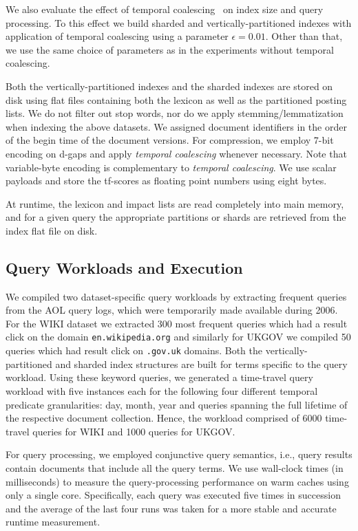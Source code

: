 We also evaluate the effect of temporal coalescing~\cite{kberberi:sigir2007} on index size and query
processing. To this effect we build sharded and vertically-partitioned indexes with application of temporal coalescing using a parameter
$\epsilon=0.01$. Other than that, we use the same choice of parameters
as in the experiments without temporal coalescing.


Both the vertically-partitioned indexes and the sharded indexes are stored on disk using flat files containing both the lexicon as well as the partitioned posting lists. We do not filter out stop words, nor do we apply stemming/lemmatization when indexing the above datasets. We assigned document identifiers in the order of the begin time of the document versions. For compression, we employ 7-bit encoding on d-gaps and apply \emph{temporal coalescing} whenever necessary. Note that variable-byte encoding is complementary to \emph{temporal coalescing}. We use scalar payloads and store the tf-scores as floating point numbers using eight bytes. 

At runtime, the lexicon and impact lists are read
completely into main memory, and for a given query the appropriate
partitions or shards are retrieved from the index flat file on disk.

\subsection{Query Workloads and Execution}
\label{sec:sharding_workloads}
We compiled two dataset-specific query workloads by extracting
frequent queries from the AOL query logs, which were temporarily made
available during 2006. For the WIKI dataset we extracted 300 most
frequent queries which had a result click on the domain
\texttt{en.wikipedia.org} and similarly for UKGOV we compiled 50
queries which had result click on \texttt{.gov.uk} domains. Both the
vertically-partitioned and sharded index structures are built for terms specific to
the query workload. Using these keyword queries, we generated a
time-travel query workload with five instances each for the following four
different temporal predicate granularities: day, month, year and
queries spanning the full lifetime of the respective document
collection. Hence, the workload comprised of 6000 time-travel queries for WIKI and 1000 queries for UKGOV.

For query processing, we employed conjunctive query semantics, i.e.,
query results contain documents that include all the query terms. We
use wall-clock times (in milliseconds) to measure the query-processing
performance on warm caches using only a
single core. Specifically, each query was executed five times in
succession and the average of the last four runs was taken for a more
stable and accurate runtime measurement.

